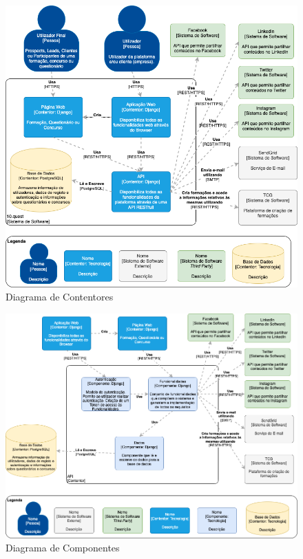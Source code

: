 \begin{figure}[ht!]
	\begin{center}
		\includegraphics[width=1\textwidth]{img/arq/diagrama-contentores}
		\caption{Diagrama de Contentores}
		\label{fig:arq-contentores}
	\end{center}
\end{figure}

\begin{figure}[ht!]
	\begin{center}
		\includegraphics[width=1\textwidth]{img/arq/diagrama-componentes}
		\caption{Diagrama de Componentes}
		\label{fig:arq-componentes}
	\end{center}
\end{figure}

